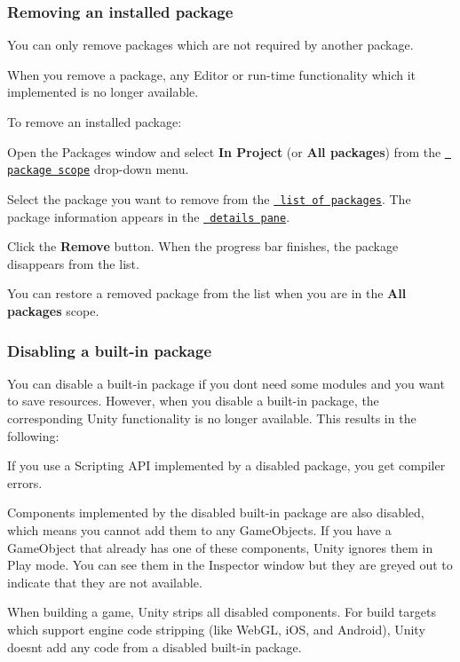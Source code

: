 \label{_PackManRemove}%
 \subsubsection*{Removing an installed package}

You can only remove packages which are not required by another package.

When you remove a package, any Editor or run-\/time functionality which it implemented is no longer available.

To remove an installed package\+:


\begin{DoxyEnumerate}
\item Open the Packages window and select {\bfseries{In Project}} (or {\bfseries{All packages}}) from the \href{\#scope}{\texttt{ package scope}} drop-\/down menu.
\item Select the package you want to remove from the \href{\#PackManLists}{\texttt{ list of packages}}. The package information appears in the \href{\#PackManDetails}{\texttt{ details pane}}.
\item Click the {\bfseries{Remove}} button. When the progress bar finishes, the package disappears from the list.
\end{DoxyEnumerate}

You can restore a removed package from the list when you are in the {\bfseries{All packages}} scope.

\label{_PackManDisable}%
 \subsubsection*{Disabling a built-\/in package}

You can disable a built-\/in package if you don\textquotesingle{}t need some modules and you want to save resources. However, when you disable a built-\/in package, the corresponding Unity functionality is no longer available. This results in the following\+:


\begin{DoxyItemize}
\item If you use a Scripting A\+PI implemented by a disabled package, you get compiler errors.
\item Components implemented by the disabled built-\/in package are also disabled, which means you cannot add them to any Game\+Objects. If you have a Game\+Object that already has one of these components, Unity ignores them in Play mode. You can see them in the Inspector window but they are greyed out to indicate that they are not available.
\item When building a game, Unity strips all disabled components. For build targets which support engine code stripping (like Web\+GL, i\+OS, and Android), Unity doesn\textquotesingle{}t add any code from a disabled built-\/in package.
\end{DoxyItemize}


